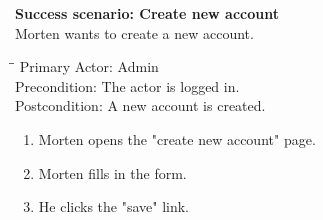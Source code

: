 \vspace{3mm}
\textbf{Success scenario: Create new account} \\
Morten wants to create a new account.
\begin{tabbing}
\hspace{5mm}\=\hspace{26mm}\=\kill
\>Primary Actor:\> Admin\\
\>Precondition:\> The actor is logged in.\\
\>Postcondition:\> A new account is created.
\end{tabbing}
\begin{enumerate} \setlength{\itemsep}{-1mm}
	\item Morten opens the "create new account" page.
	\item Morten fills in the form.
	\item He clicks the "save" link.
\end{enumerate}